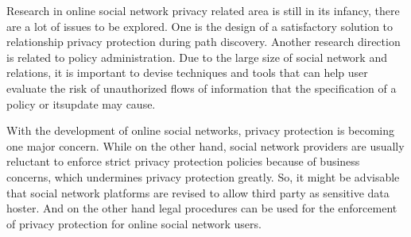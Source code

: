 \documentclass[12pt]{article}
\begin{document}
Research in online social network privacy related area is still in its
infancy, there are a lot of issues to be explored. One is the design
of a satisfactory solution to relationship privacy protection during
path discovery. Another research direction is related to policy
administration. Due to the large size of social network and relations,
it is important to devise techniques and tools that can help user
evaluate the risk of unauthorized flows of information that the
specification of a policy or itsupdate may cause.

With the development of online social networks, privacy protection is
becoming one major concern. While on the other hand, social network
providers are usually reluctant to enforce strict privacy protection
policies because of business concerns, which undermines privacy
protection greatly. So, it might be advisable that social network
platforms are revised to allow third party as sensitive data
hoster. And on the other hand legal procedures can be used for the
enforcement of privacy protection for online social network users. 



\end{document}
